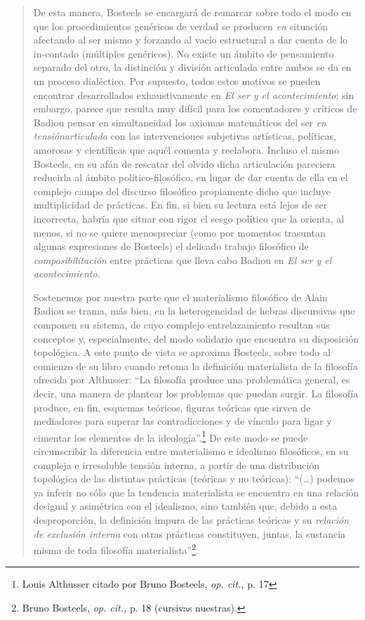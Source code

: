 \begin{quote}
De esta manera, Bosteels se encargará de remarcar sobre todo el modo en que los procedimientos genéricos de verdad se producen \emph{en} situación afectando al ser mismo y forzando al vacío estructural a dar cuenta de lo in-contado (múltiples genéricos). No existe un ámbito de pensamiento separado del otro, la distinción y división articulada entre ambos se da en un proceso dialéctico. Por supuesto, todos estos motivos se pueden encontrar desarrollados exhaustivamente en \emph{El ser y el acontecimiento}; sin embargo, parece que resulta muy difícil para los comentadores y críticos de Badiou pensar en simultaneidad los axiomas matemáticos del ser \emph{en tensiónarticulada} con las intervenciones subjetivas artísticas, políticas, amorosas y científicas que aquél comenta y reelabora. Incluso el mismo Bosteels, en su afán de rescatar del olvido dicha articulación pareciera reducirla al ámbito político-filosófico, en lugar de dar cuenta de ella en el complejo campo del discurso filosófico propiamente dicho que incluye  multiplicidad de prácticas. En fin, si bien su lectura está lejos de ser incorrecta, habría que situar con rigor el sesgo político que la orienta, al menos, si no se quiere menospreciar (como por momentos trasuntan algunas expresiones de Bosteels) el delicado trabajo filosófico de \emph{composibilitación} entre prácticas que lleva cabo Badiou en \emph{El ser y el acontecimiento}.

Sostenemos por nuestra parte que el materialismo filosófico de Alain Badiou se trama, más bien, en la heterogeneidad de hebras discursivas que componen su sistema, de cuyo complejo entrelazamiento resultan sus conceptos y, especialmente, del modo solidario que encuentra su disposición topológica. A este punto de vista se aproxima Bosteels, sobre todo al comienzo de su libro  cuando retoma la definición materialista de la filosofía ofrecida por Althusser: \enquote{La filosofía produce una problemática general, es decir, una manera de plantear  los problemas que puedan surgir. La filosofía produce, en fin, esquemas teóricos, figuras teóricas que sirven de mediadores para superar las contradicciones y de vínculo para ligar y cimentar los elementos de la ideología}.\footnote{Louis Althusser citado por Bruno Bosteels, \emph{op. cit.,} p. 17} De este modo se puede circunscribir la diferencia entre materialismo e idealismo filosóficos, en su compleja e irresoluble tensión interna, a partir de una distribución topológica de las distintas prácticas (teóricas y no teóricas): \enquote{(\dots) podemos ya inferir no sólo que la tendencia materialista se encuentra en una relación desigual y asimétrica con el idealismo, sino también que, debido a esta desproporción, la definición impura de las prácticas teóricas y su \emph{relación de exclusión interna} con otras prácticas constituyen, juntas, la sustancia misma de toda filosofía materialista}\footnote{Bruno Bosteels, \emph{op. cit.,} p. 18 (cursivas nuestras).}.


\end{quote}

